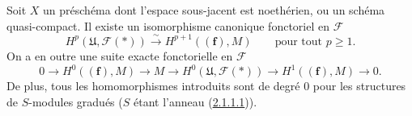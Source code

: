 \begin{proposition}[2.1.3]
\label{III.2.1.3-fr}
Soit $X$ un préschéma dont l'espace sous-jacent est noethérien, ou un schéma
quasi-compact. Il existe un isomorphisme canonique fonctoriel en $\mathcal F$
\begin{equation}
\label{III.2.1.3.1-fr}
\tag{2.1.3.1}
H^p(\mathfrak U,\mathcal F(*))
\xrightarrow{\sim}H^{p+1}((\mathbf f),M)
\qquad\text{pour tout }p\geq1.
\end{equation}
On a en outre une suite exacte fonctorielle en $\mathcal F$
\begin{equation}
\label{III.2.1.3.2-fr}
\tag{2.1.3.2}
0\longrightarrow H^0((\mathbf f),M)\longrightarrow M
\longrightarrow H^0(\mathfrak U,\mathcal F(*))
\longrightarrow H^1((\mathbf f),M)\longrightarrow0.
\end{equation}
De plus, tous les homomorphismes introduits sont de degré $0$ pour les
structures de $S$-modules gradués ($S$ étant l'anneau
(\hyperref[III.2.1.1.1-fr]{2.1.1.1})).
\end{proposition}
\providecommand{\bbGamma}{\boldsymbol{\Gamma}}
\providecommand{\shProj}{\mathcal{P}\mathrm{roj}}


